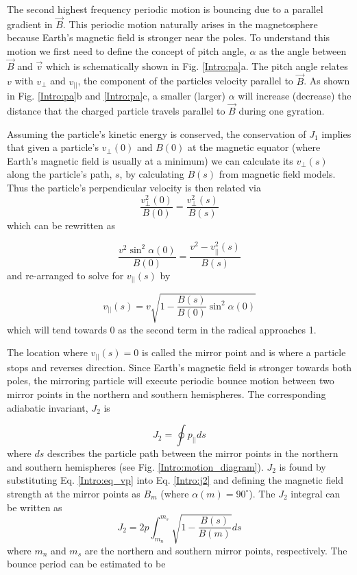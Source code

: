 The second highest frequency periodic motion is bouncing due to a parallel gradient in $\vec{B}$. This periodic motion naturally arises in the magnetosphere because Earth's magnetic field is stronger near the poles. To understand this motion we first need to define the concept of pitch angle, $\alpha$ as the angle between $\vec{B}$ and $\vec{v}$ which is schematically shown in Fig. \ref{Intro:pa}a. The pitch angle relates $v$ with $v_\perp$ and $v_{||}$, the component of the particles velocity parallel to $\vec{B}$. As shown in Fig. \ref{Intro:pa}b and \ref{Intro:pa}c, a smaller (larger) $\alpha$ will increase (decrease) the distance that the charged particle travels parallel to $\vec{B}$ during one gyration.

Assuming the particle's kinetic energy is conserved, the conservation of $J_1$ implies that given a particle's $v_\perp(0)$ and $B(0)$ at the magnetic equator (where Earth's magnetic field is usually at a minimum) we can calculate its $v_\perp(s)$ along the particle's path, $s$, by calculating $B(s)$ from magnetic field models. Thus the particle's perpendicular velocity is then related via
\begin{equation} \label{j1_conservation}
\frac{v_\perp^2 (0)}{B(0)} = \frac{v_\perp^2 (s)}{B(s)}
\end{equation} which can be rewritten as 

\begin{equation}
\frac{v^2 \sin^2{\alpha(0)}}{B(0)} = \frac{v^2 - v^2_{||}(s)}{B(s)}
\end{equation} and re-arranged to solve for $v_{||}(s)$ by

\begin{equation} \label{Intro:eq_vp} 
v_{||}(s) = v \sqrt{1 - \frac{B(s)}{B(0)} \sin^2{\alpha(0)}}
\end{equation} which will tend towards 0 as the second term in the radical approaches 1.

The location where $v_{||}(s) = 0$ is called the mirror point and is where a particle stops and reverses direction. Since Earth's magnetic field is stronger towards both poles, the mirroring particle will execute periodic bounce motion between two mirror points in the northern and southern hemispheres. The corresponding adiabatic invariant, $J_2$ is

\begin{equation} \label{Intro:j2}
J_2 = \oint p_{||} ds
\end{equation} where $ds$ describes the particle path between the mirror points in the northern and southern hemispheres (see Fig. \ref{Intro:motion_diagram}). $J_2$ is found by substituting Eq. \ref{Intro:eq_vp} into Eq. \ref{Intro:j2} and defining the magnetic field strength at the mirror points as $B_m$ (where $\alpha(m) = 90^\circ$). The $J_2$ integral can be written as     
\begin{equation}
J_2 = 2 p \int_{m_n}^{m_s} \sqrt{1 - \frac{B(s)}{B(m)}} ds
\end{equation} where $m_n$ and $m_s$ are the northern and southern mirror points, respectively. The bounce period can be estimated \citep[e.g.][]{Baumjohann1997} to be 

